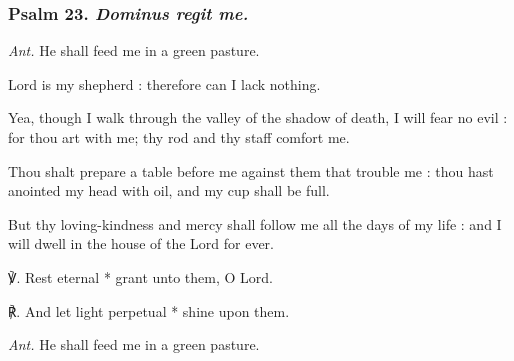 \subsubsection{Psalm 23. \textit{Dominus regit me.}}\par\noindent
\textit{Ant.} He shall feed me {\dag} in a green pasture.\par
{} Lord is my shepherd : therefore can I lack nothing.\par
{}
Yea, though I walk through the valley of the shadow of death, I will fear no evil : for thou art with me; thy rod and thy staff comfort me.\par
{}Thou shalt prepare a table before me against them that trouble me : thou hast anointed my head with oil, and my cup shall be full.\par
{}But thy loving-kindness and mercy shall follow me all the days of my life : and I will dwell in the house of the Lord for ever.\par
℣. Rest eternal * grant unto them, O Lord.\par
℟. And let light perpetual * shine upon them.\par\noindent
\textit{Ant.} He shall feed me in a green pasture.

